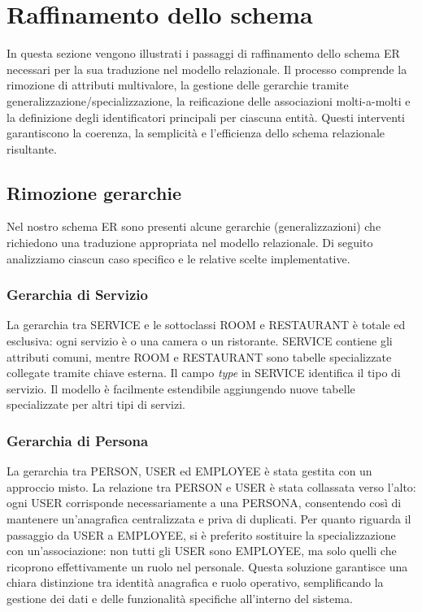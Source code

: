 \documentclass[a4paper,12pt]{report}
\begin{document}
\section{Raffinamento dello schema}
In questa sezione vengono illustrati i passaggi di raffinamento dello
schema ER necessari per la sua traduzione nel modello relazionale. Il
processo comprende la rimozione di attributi multivalore, la gestione
delle gerarchie tramite generalizzazione/specializzazione, la
reificazione delle associazioni molti-a-molti e la definizione degli
identificatori principali per ciascuna entità. Questi interventi
garantiscono la coerenza, la semplicità e l'efficienza dello schema
relazionale risultante.

\subsection{Rimozione gerarchie}
Nel nostro schema ER sono presenti alcune gerarchie
(generalizzazioni) che richiedono una traduzione appropriata nel
modello relazionale. Di seguito analizziamo ciascun caso specifico e
le relative scelte implementative.

\subsubsection{Gerarchia di Servizio}
La gerarchia tra SERVICE e le sottoclassi ROOM e RESTAURANT è totale
ed esclusiva: ogni servizio è o una camera o un ristorante. SERVICE
contiene gli attributi comuni, mentre ROOM e RESTAURANT sono tabelle
specializzate collegate tramite chiave esterna. Il campo
\textit{type} in SERVICE identifica il tipo di servizio. Il modello è
facilmente estendibile aggiungendo nuove tabelle specializzate per
altri tipi di servizi.

\subsubsection{Gerarchia di Persona}
La gerarchia tra PERSON, USER ed EMPLOYEE è stata gestita con un
approccio misto. La relazione tra PERSON e USER è stata collassata
verso l'alto: ogni USER corrisponde necessariamente a una PERSONA,
consentendo così di mantenere un'anagrafica centralizzata e priva di
duplicati. Per quanto riguarda il passaggio da USER a EMPLOYEE, si è
preferito sostituire la specializzazione con un'associazione: non
tutti gli USER sono EMPLOYEE, ma solo quelli che ricoprono
effettivamente un ruolo nel personale. Questa soluzione garantisce
una chiara distinzione tra identità anagrafica e ruolo operativo,
semplificando la gestione dei dati e delle funzionalità specifiche
all'interno del sistema.
\end{document}
